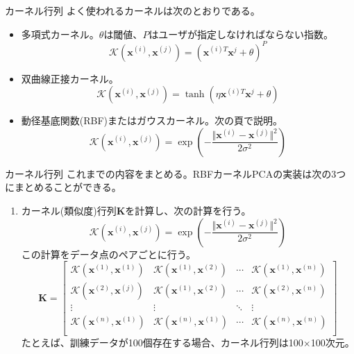\documentclass[aspectratio=169, dvipdfmx, 11pt]{beamer} %
\begin{document}
\begin{frame}{カーネル行列}
    よく使われるカーネルは次のとおりである。
    \begin{itemize}
        \item 多項式カーネル。\(\theta\)は閾値、\(P\)はユーザが指定しなければならない指数。
        \begin{equation*}
            \mathcal{K}(\bm{x}^{(i)}, \bm{x}^{(j)}) = (\bm{x}^{(i)T} \bm{x}^{j}+\theta)^P
        \end{equation*}
        \item 双曲線正接カーネル。
        \vspace{1em}
        \begin{equation*}
            \mathcal{K}(\bm{x}^{(i)}, \bm{x}^{(j)}) = \tanh(\eta \bm{x}^{(i)T} \bm{x}^{j}+\theta)
        \end{equation*}
        \item 動径基底関数(RBF)またはガウスカーネル。次の頁で説明。
        \begin{equation*}
            \mathcal{K}(\bm{x}^{(i)}, \bm{x}^{(j)}) = 
            \exp (- \frac{\Vert\bm{x}^{(i)} - \bm{x}^{(j)}\Vert^2}{2 \sigma^2 })
        \end{equation*}
    \end{itemize}
\end{frame}

\begin{frame}{カーネル行列}
    これまでの内容をまとめる。RBFカーネルPCAの実装は次の3つにまとめることができる。
    \begin{enumerate}
        \item カーネル(類似度)行列\(\bm{K}\)を計算し、次の計算を行う。
        \begin{equation*}
            \mathcal{K}(\bm{x}^{(i)}, \bm{x}^{(j)}) = 
            \exp (- \frac{\Vert\bm{x}^{(i)} - \bm{x}^{(j)}\Vert^2}{2 \sigma^2 })
        \end{equation*}
        この計算をデータ点のペアごとに行う。
        \begin{equation*}
            \bm{K} = 
            \begin{bmatrix}
                \mathcal{K}(\bm{x}^{(1)}, \bm{x}^{(1)}) & \mathcal{K}(\bm{x}^{(1)}, \bm{x}^{(2)}) & \cdots  & \mathcal{K}(\bm{x}^{(1)}, \bm{x}^{(n)}) \\
                \mathcal{K}(\bm{x}^{(2)}, \bm{x}^{(j)}) & \mathcal{K}(\bm{x}^{(1)}, \bm{x}^{(2)}) & \cdots  & \mathcal{K}(\bm{x}^{(2)}, \bm{x}^{(n)}) \\
                \vdots  & \vdots  & \ddots   & \vdots  \\
                \mathcal{K}(\bm{x}^{(n)}, \bm{x}^{(1)}) & \mathcal{K}(\bm{x}^{(n)}, \bm{x}^{(1)}) & \cdots  & \mathcal{K}(\bm{x}^{(n)}, \bm{x}^{(n)}) \\
            \end{bmatrix}
        \end{equation*}
        たとえば、訓練データが100個存在する場合、カーネル行列は100\(\times\)100次元。
    \end{enumerate}
\end{frame}
\end{document}
